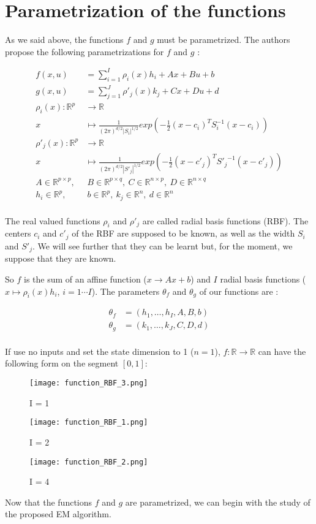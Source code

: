 
\section{Parametrization of the functions}

As we said above, the functions $f$ and $g$ must be parametrized.
The authors propose the following parametrizations for $f$ and $g$ :

\begin{align*}
  f(x,u) &= \sum_{i=1}^I \rho_i(x) h_i + Ax + Bu + b\\
  g(x,u) &= \sum_{j=1}^J \rho'_j(x) k_j + Cx + Du + d\\
  \rho_i(x) \colon \mathbb{R}^p &\to \mathbb{R}\\
  x &\mapsto \frac{1}{(2\pi)^{d/2}|S_i|^{1/2}} exp\left(-\frac{1}{2}(x-c_i)^T S_{i}^{-1}(x-c_i)\right)\\
  \rho'_j(x) \colon \mathbb{R}^p &\to \mathbb{R}\\
  x &\mapsto \frac{1}{(2\pi)^{d/2}|S'_j|^{1/2}} exp\left(-\frac{1}{2}(x-c'_j)^T {S'_{j}}^{-1}(x-c'_j)\right)\\
  A \in \mathbb{R}^{p \times p}, & \  B \in \mathbb{R}^{p \times q}, \  C \in \mathbb{R}^{n \times p}, \  D \in \mathbb{R}^{n \times q}\\
  h_i \in \mathbb{R}^{p},& \  b \in \mathbb{R}^p, \  k_j \in \mathbb{R}^{n},\   d \in \mathbb{R}^n\\
\end{align*}

The real valued functions $\rho_i$ and $\rho'_j$ are called radial basis functions (RBF).
The centers $c_i$ and $c'_j$ of the RBF are supposed to be known, as well as the width $S_i$ and $S'_j$.
We will see further that they can be learnt but, for the moment, we suppose that they are known.


So $f$ is the sum of an affine function ($x \rightarrow Ax + b$) and $I$ radial basis functions ($x \mapsto \rho_i(x) h_i$, $i=1 \cdots I$).
The parameters $\theta_f$ and $\theta_g$ of our functions are :

\begin{align*}
  \theta_f &= \left( h_1, \ldots , h_I, A, B, b\right) \\
  \theta_g &= \left( k_1, \ldots , k_J, C, D, d\right) \\
\end{align*}

If use no inputs and set the state dimension to 1 ($n = 1$), $f : \mathbb{R} \to \mathbb{R}$ can have the following form on the segment $\left [ 0 , 1 \right ]$:

\begin{figure}[H]
\captionsetup{labelformat=empty}
  \texttt{[image: function\_RBF\_3.png]}
  \caption{I = 1}
\endminipage\hfill
{}
  \texttt{[image: function\_RBF\_1.png]}
  \caption{I = 2}
\endminipage\hfill
{}
  \texttt{[image: function\_RBF\_2.png]}
  \caption{I = 4}
\endminipage\hfill
\end{figure}

Now that the functions $f$ and $g$ are parametrized, we can begin with the study of the proposed EM algorithm.
